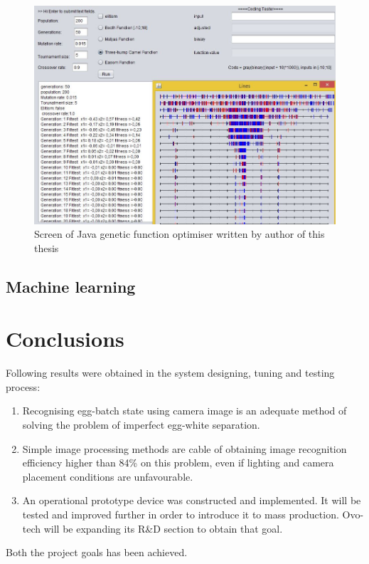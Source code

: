 \documentclass[12pt,twoside,a4paper]{article}
\begin{document}
\begin{figure}[H]
\centering
\includegraphics[width=0.7\paperwidth]{genetic}
\caption{Screen of Java genetic function optimiser written by author of this thesis \cite{morph}}\label{fig:generic}
\end{figure}


\subsection{Machine learning}

\section{Conclusions}

Following results were obtained in the system designing, tuning and testing process:
\begin{enumerate}
\item Recognising egg-batch state using camera image is an adequate method of solving the problem of imperfect egg-white separation.
\item Simple image processing methods are cable of obtaining image recognition efficiency higher than 84\% on this problem, even if lighting and camera placement conditions are unfavourable.
\item An operational prototype device was constructed and implemented. It will be tested and improved further in order to introduce it to mass production. Ovo-tech will be expanding its R\&D section to obtain that goal.
\end{enumerate}

Both the project goals has been achieved.
\end{document}
